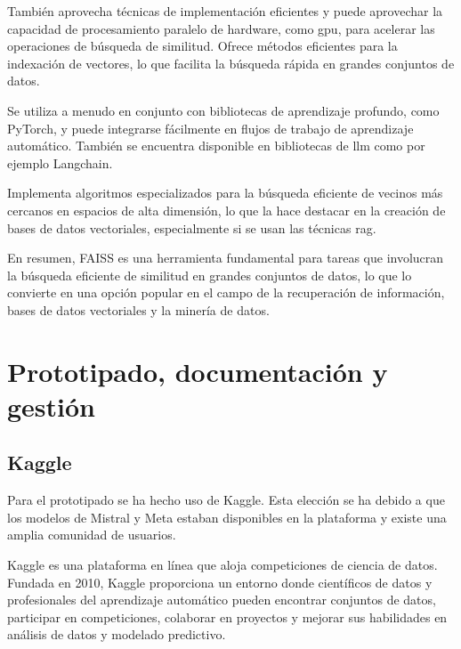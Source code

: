También aprovecha técnicas de implementación eficientes y puede aprovechar la capacidad de procesamiento paralelo de hardware, como \acrshort{gpu}, para acelerar las operaciones de búsqueda de similitud. Ofrece métodos eficientes para la indexación de vectores, lo que facilita la búsqueda rápida en grandes conjuntos de datos.

Se utiliza a menudo en conjunto con bibliotecas de aprendizaje profundo, como PyTorch, y puede integrarse fácilmente en flujos de trabajo de aprendizaje automático. También se encuentra disponible en bibliotecas de \acrshort{llm} como por ejemplo Langchain. 

Implementa algoritmos especializados para la búsqueda eficiente de vecinos más cercanos en espacios de alta dimensión, lo que la hace destacar en la creación de bases de datos vectoriales, especialmente si se usan las técnicas \acrshort{rag}.

En resumen, FAISS es una herramienta fundamental para tareas que involucran la búsqueda eficiente de similitud en grandes conjuntos de datos, lo que lo convierte en una opción popular en el campo de la recuperación de información, bases de datos vectoriales y la minería de datos.


\section{Prototipado, documentación y gestión}

\subsection{Kaggle}

Para el prototipado se ha hecho uso de Kaggle. Esta elección se ha debido a que los modelos de Mistral y Meta estaban disponibles en la plataforma y existe una amplia comunidad de usuarios.

Kaggle es una plataforma en línea que aloja competiciones de ciencia de datos. Fundada en 2010, Kaggle proporciona un entorno donde científicos de datos y profesionales del aprendizaje automático pueden encontrar conjuntos de datos, participar en competiciones, colaborar en proyectos y mejorar sus habilidades en análisis de datos y modelado predictivo.

